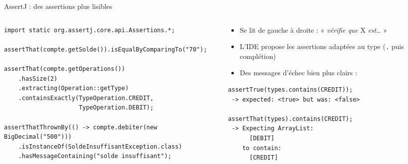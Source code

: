 \documentclass[aspectratio=169,10pt]{beamer}
\begin{document}
\begin{frame}[fragile]{AssertJ : des assertions plus lisibles}
  \begin{columns}[T]
    \begin{column}{0.56\textwidth}
\begin{lstlisting}[basicstyle=\lstcode\scriptsize]
import static org.assertj.core.api.Assertions.*;

assertThat(compte.getSolde()).isEqualByComparingTo("70");

assertThat(compte.getOperations())
    .hasSize(2)
    .extracting(Operation::getType)
    .containsExactly(TypeOperation.CREDIT,
                     TypeOperation.DEBIT);

assertThatThrownBy(() -> compte.debiter(new BigDecimal("500")))
    .isInstanceOf(SoldeInsuffisantException.class)
    .hasMessageContaining("solde insuffisant");
\end{lstlisting}
    \end{column}
    \begin{column}{0.42\textwidth}
      \begin{itemize}
        \item Se lit de gauche à droite : « \textit{vérifie que} X \textit{est}\ldots{} »
        \item L'IDE propose les assertions adaptées au type (\texttt{.} puis complétion)
        \item Des messages d'échec bien plus clairs :
      \end{itemize}
\begin{lstlisting}[style=sortie]
assertTrue(types.contains(CREDIT));
 -> expected: <true> but was: <false>

assertThat(types).contains(CREDIT);
 -> Expecting ArrayList:
      [DEBIT]
    to contain:
      [CREDIT]
\end{lstlisting}
    \end{column}
  \end{columns}
\end{frame}
\end{document}
